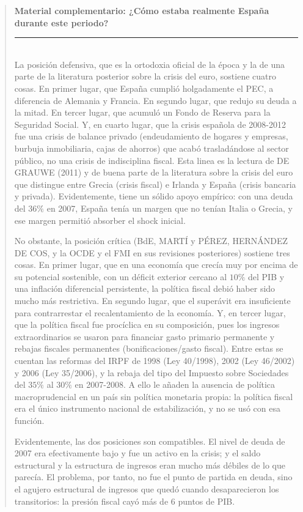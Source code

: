 \documentclass[10pt,a4paper]{article}
\newenvironment{specialblock}[1]{%
      \begin{quote} %
      \small %
      \noindent\textbf{#1}\\[-0.3em] %
      \rule{\linewidth}{0.4pt}\\[0.6em]}{
      \end{quote}}
\begin{document}
\begin{specialblock}{\textbf{Material complementario:} ¿Cómo estaba \textbf{realmente} España durante este periodo?}
    La posición defensiva, que es la ortodoxia oficial de la época y la de una parte de la literatura posterior sobre la crisis del euro, sostiene cuatro cosas. En primer lugar, que España cumplió holgadamente el PEC, a diferencia de Alemania y Francia. En segundo lugar, que redujo su deuda a la mitad. En tercer lugar, que acumuló un Fondo de Reserva para la Seguridad Social. Y, en cuarto lugar, que la crisis española de 2008-2012 fue una crisis de balance privado (endeudamiento de hogares y empresas, burbuja inmobiliaria, cajas de ahorros) que acabó trasladándose al sector público, no una crisis de indisciplina fiscal. Esta linea es la lectura de DE GRAUWE (2011) y de buena parte de la literatura sobre la crisis del euro que distingue entre Grecia (crisis fiscal) e Irlanda y España (crisis bancaria y privada). Evidentemente, tiene un sólido apoyo empírico: con una deuda del $36\%$ en 2007, España tenía un margen que no tenían Italia o Grecia, y ese margen permitió absorber el shock inicial.

    No obstante, la posición crítica (BdE, MARTÍ y PÉREZ, HERNÁNDEZ DE COS, y la OCDE y el FMI en sus revisiones posteriores) sostiene tres cosas. En primer lugar, que en una economía que crecía muy por encima de su potencial sostenible, con un déficit exterior cercano al $10\%$ del PIB y una inflación diferencial persistente, la política fiscal debió haber sido mucho más restrictiva. En segundo lugar, que el superávit era insuficiente para contrarrestar el recalentamiento de la economía. Y, en tercer lugar, que la política fiscal fue procíclica en su composición, pues los ingresos extraordinarios se usaron para financiar gasto primario permanente y rebajas fiscales permanentes (bonificaciones/gasto fiscal). Entre estas se cuentan las reformas del IRPF de 1998 (Ley 40/1998), 2002 (Ley 46/2002) y 2006 (Ley 35/2006), y la rebaja del tipo del Impuesto sobre Sociedades del $35\%$ al $30\%$ en 2007-2008. A ello le añaden la ausencia de política macroprudencial en un país sin política monetaria propia: la política fiscal era el único instrumento nacional de estabilización, y no se usó con esa función.

    Evidentemente, las dos posiciones son compatibles. El nivel de deuda de 2007 era efectivamente bajo y fue un activo en la crisis; y el saldo estructural y la estructura de ingresos eran mucho más débiles de lo que parecía. El problema, por tanto, no fue el punto de partida en deuda, sino el agujero estructural de ingresos que quedó cuando desaparecieron los transitorios: la presión fiscal cayó más de $6$ puntos de PIB.


\end{specialblock}
\end{document}

